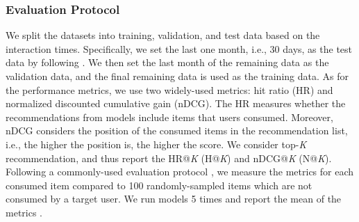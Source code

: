 \documentclass[sigconf]{acmart}
\begin{document}
\subsubsection{\textbf{Evaluation Protocol}}
We split the datasets into training, validation, and test data based on the interaction times. Specifically, we set the last one month, i.e., 30 days, as the test data by following \cite{hyun2020interest}. 
We then set the last month of the remaining data as the validation data, and the final remaining data is used as the training data.
As for the performance metrics, we use two widely-used metrics: hit ratio (HR) and normalized discounted cumulative gain (nDCG). The HR measures whether the recommendations from models include items that users consumed. Moreover, nDCG considers the position of the consumed items in the recommendation list, i.e., the higher the position is, the higher the score. We consider top-\textit{K} recommendation, and thus report the HR@\textit{K} (H@\textit{K}) and nDCG@\textit{K} (N@\textit{K}). 
Following a commonly-used evaluation protocol \cite{li2020time,hyun2020interest,cho2021learning}, we measure the metrics for each consumed item compared to 100 randomly-sampled items which are not consumed by a target user. We run models 5 times and report the mean of the metrics \cite{ma2019hierarchical,cho2021unsupervised}.
\end{document}
